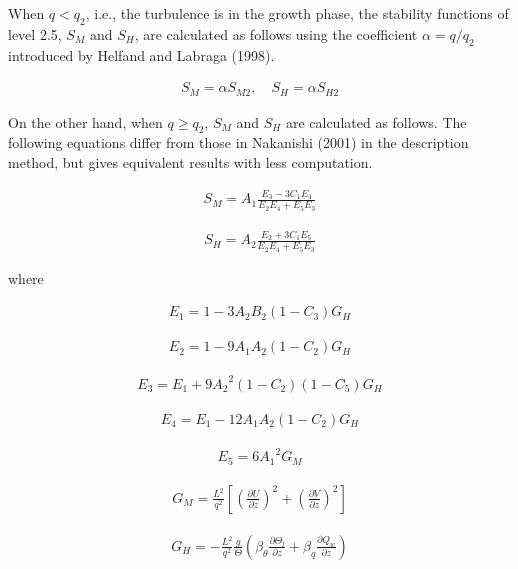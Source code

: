 When \(q<q_2\), i.e., the turbulence is in the growth phase, the
stability functions of level 2.5, \(S_M\) and \(S_H\), are calculated as
follows using the coefficient \(\alpha=q/q_2\) introduced by Helfand and
Labraga (1998).

\begin{eqnarray}S_M=\alpha S_{M2},\quad S_H=\alpha S_{H2}\end{eqnarray}

On the other hand, when \(q \geq q_2\), \(S_M\) and \(S_H\) are
calculated as follows. The following equations differ from those in
Nakanishi (2001) in the description method, but gives equivalent results
with less computation.

\begin{eqnarray}S_M=A_1\frac{E_3-3C_1 E_4}{E_2 E_4+E_5 E_3}\end{eqnarray}

\begin{eqnarray}S_H=A_2\frac{E_2+3C_1 E_5}{E_2 E_4+E_5 E_3}\end{eqnarray}

where

\begin{eqnarray}E_1=1-3A_2B_2(1-C_3)G_H\end{eqnarray}

\begin{eqnarray}E_2=1-9A_1A_2(1-C_2)G_H\end{eqnarray}

\begin{eqnarray}E_3=E_1+9{A_2}^2(1-C_2)(1-C_5)G_H\end{eqnarray}

\begin{eqnarray}E_4=E_1-12A_1A_2(1-C_2)G_H\end{eqnarray}

\begin{eqnarray}E_5=6{A_1}^2G_M\end{eqnarray}

\begin{eqnarray}G_M=\frac{L^2}{q^2}\left[\left(\frac{\partial U}{\partial z}\right)^2+\left(\frac{\partial V}{\partial z}\right)^2\right]\end{eqnarray}

\begin{eqnarray}G_H=-\frac{L^2}{q^2}\frac{g}{\Theta}\left(\beta_\theta \frac{\partial \Theta_l}{\partial z}+\beta_q \frac{\partial Q_w}{\partial z}\right)\end{eqnarray}


